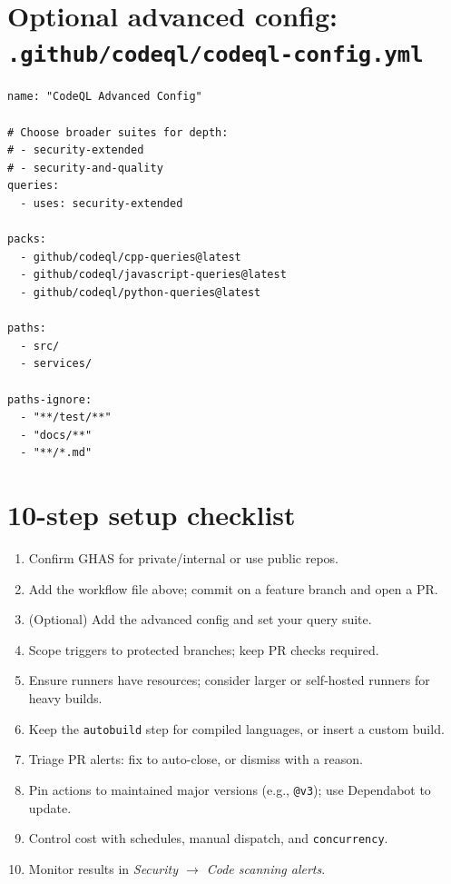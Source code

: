 \documentclass[11pt]{article}
\begin{document}
\section*{Optional advanced config: \texttt{.github/codeql/codeql-config.yml}}
\begin{verbatim}
name: "CodeQL Advanced Config"

# Choose broader suites for depth:
# - security-extended
# - security-and-quality
queries:
  - uses: security-extended

packs:
  - github/codeql/cpp-queries@latest
  - github/codeql/javascript-queries@latest
  - github/codeql/python-queries@latest

paths:
  - src/
  - services/

paths-ignore:
  - "**/test/**"
  - "docs/**"
  - "**/*.md"
\end{verbatim}

\section*{10-step setup checklist}
\begin{enumerate}[leftmargin=1.1em,itemsep=2pt,topsep=2pt]
  \item Confirm GHAS for private/internal or use public repos.
  \item Add the workflow file above; commit on a feature branch and open a PR.
  \item (Optional) Add the advanced config and set your query suite.
  \item Scope triggers to protected branches; keep PR checks required.
  \item Ensure runners have resources; consider larger or self-hosted runners for heavy builds.
  \item Keep the \texttt{autobuild} step for compiled languages, or insert a custom build.
  \item Triage PR alerts: fix to auto-close, or dismiss with a reason.
  \item Pin actions to maintained major versions (e.g., \texttt{@v3}); use Dependabot to update.
  \item Control cost with schedules, manual dispatch, and \texttt{concurrency}.
  \item Monitor results in \textit{Security $\rightarrow$ Code scanning alerts}.
\end{enumerate}
\end{document}

